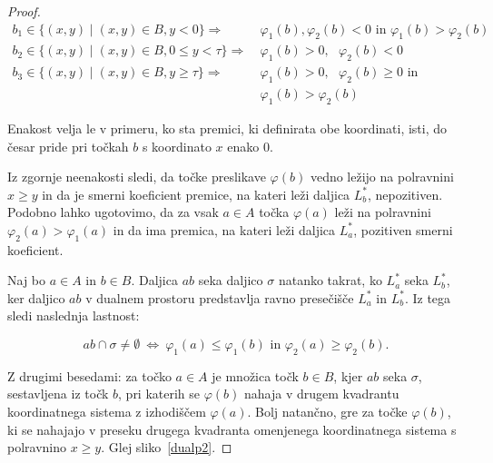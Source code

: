\documentclass[a4paper, 12pt]{book}
\begin{document}
\begin{proof}
\begin{align*}
    b_1 \in \{ (x,y) \mid (x,y) \in B, y < 0 \} \Rightarrow &~ \varphi_1(b),\varphi_2(b) < 0 \text{ in } \varphi_1(b) > \varphi_2(b) \\
b_2 \in \{ (x,y) \mid (x,y) \in B, 0 \le y < \tau \} \Rightarrow &~ \varphi_1(b) > 0, \text{ } \varphi_2(b) < 0 \\
    b_3 \in \{ (x,y) \mid (x,y) \in B, y \ge \tau \} \Rightarrow &~ \varphi_1(b) > 0, \text{ } \varphi_2(b) \ge 0 \text{ in }\\ 
    &~\varphi_1(b) > \varphi_2(b)
\end{align*}

Enakost velja le v primeru, ko sta premici, ki definirata obe koordinati, isti, do česar pride pri točkah $b$ s koordinato $x$ enako $0$. 

Iz zgornje neenakosti sledi, da točke preslikave $\varphi(b)$ vedno ležijo na polravnini $x \geq y$ in da je smerni koeficient premice, na kateri leži daljica $L^*_b$, nepozitiven. Podobno lahko ugotovimo, da za vsak $a \in A$ točka $\varphi(a)$ leži na polravnini $\varphi_2(a) > \varphi_1(a)$ in da ima premica, na kateri leži daljica $L^*_a$, pozitiven smerni koeficient.

Naj bo $a \in A$ in $b \in B$. Daljica $ab$ seka daljico $\sigma$ natanko takrat, ko $L^*_a$ seka $L^*_b$, ker daljico $ab$ v dualnem prostoru predstavlja ravno presečišče $L^*_a$ in $L^*_b$. Iz tega sledi naslednja lastnost:

	\[
		ab \cap \sigma \neq \emptyset ~\Longleftrightarrow ~ 
		\varphi_1(a)\le \varphi_1(b) \text{ in } \varphi_2(a)\ge \varphi_2(b).
	\]	
	
Z drugimi besedami: za točko $a \in A$ je množica točk $b \in B$, kjer $ab$ seka $\sigma$, sestavljena iz točk $b$, pri katerih se $\varphi(b)$ nahaja v drugem kvadrantu koordinatnega sistema z izhodiščem $\varphi(a)$. Bolj natančno, gre za točke $\varphi(b)$, ki se nahajajo v preseku drugega kvadranta omenjenega koordinatnega sistema s polravnino $x \geq y$. Glej sliko~\ref{dualp2}.


\end{proof}
\end{document}
